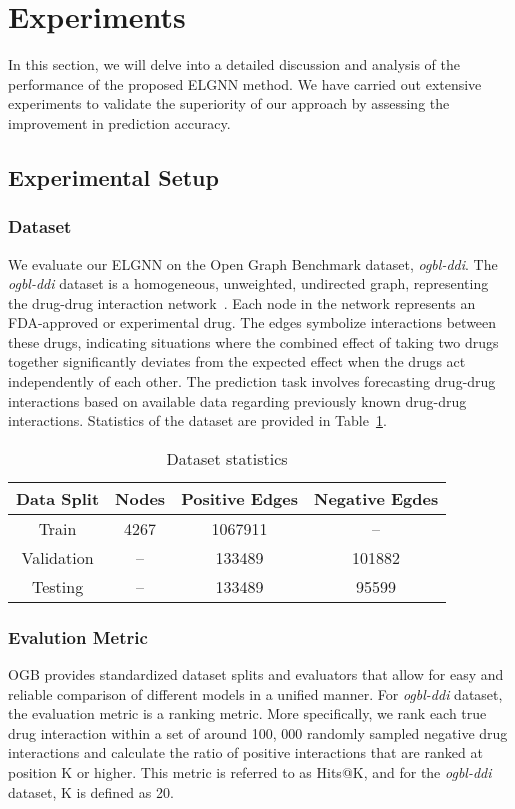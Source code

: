\documentclass[11pt]{article}
\begin{document}
\section{Experiments}
In this section, we will delve into a detailed discussion and analysis of the performance of the proposed ELGNN method. We have carried out extensive experiments to validate the superiority of our approach by assessing the improvement in prediction accuracy. 
\subsection{Experimental Setup}

\subsubsection{Dataset}
    We evaluate our ELGNN on the Open Graph Benchmark dataset, \textit{ogbl-ddi}. 
    The \textit{ogbl-ddi} dataset is a homogeneous, unweighted, undirected graph, 
    representing the drug-drug interaction network~\cite{wishart2018drugbank}. 
    Each node in the network represents an FDA-approved or experimental drug. 
    The edges symbolize interactions between these drugs, 
    indicating situations where the combined effect of taking two drugs together significantly deviates from the expected effect when the drugs act independently of each other. 
    The prediction task involves forecasting drug-drug interactions based on available data regarding previously known drug-drug interactions. 
    Statistics of the dataset are provided in Table~\ref{tab:dataset}. 


\begin{table}[ht]
    \centering
    \caption{Dataset statistics}
    \small
\begin{tabular}{c|ccc}
    \toprule
         Data Split & Nodes & Positive Edges & Negative Egdes \\ \midrule
         Train     & 4267 & 1067911 & -- \\ 
         Validation & --    & 133489   & 101882 \\
         Testing & -- & 133489  &95599 \\
    \bottomrule
    \end{tabular}
    \label{tab:dataset}
\end{table}

\subsubsection{Evalution Metric}
OGB provides standardized dataset splits and evaluators that allow for easy and reliable comparison of different models in a unified manner. For \textit{ogbl-ddi} dataset, the evaluation metric is a ranking metric. More specifically, we rank each true drug interaction within a set of around 100, 000 randomly sampled negative drug interactions and calculate the ratio of positive interactions that are ranked at position K or higher. This metric is referred to as Hits@K, and for the \textit{ogbl-ddi} dataset, K is defined as 20.
\end{document}
